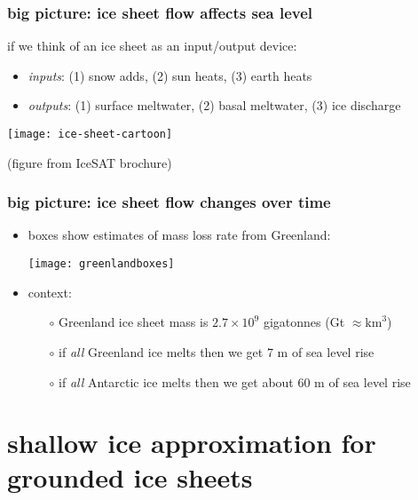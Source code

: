 \documentclass{beamer}
\begin{document}
\begin{frame}
  \frametitle{big picture: ice sheet flow affects sea level}

\small
if we think of an ice sheet as an input/output device:
\begin{itemize}
\item \emph{inputs}: (1) snow adds, (2) sun heats, (3) earth heats
\item \emph{outputs}: (1) surface meltwater, (2) basal meltwater, (3) ice discharge
\end{itemize}

\begin{center}
  \texttt{[image: ice-sheet-cartoon]}

  \tiny (figure from IceSAT brochure)
\end{center}
\end{frame}


\begin{frame}
  \frametitle{big picture: ice sheet flow changes over time}

\small
\begin{itemize}
\item boxes show estimates of mass loss rate from Greenland:
\begin{center}
    \texttt{[image: greenlandboxes]}
\end{center}

\vspace{-0.21in}
\item context:
  \begin{itemize}
  \item[$\circ$]  Greenland ice sheet mass is $2.7 \times 10^9$ gigatonnes (Gt $\approx \text{km}^3$) %
  \item[$\circ$]  if \emph{all} Greenland ice melts then we get 7 m of sea level rise
  \item[$\circ$]  if \emph{all} Antarctic ice melts then we get about 60 m of sea level rise
  \end{itemize}
\end{itemize}
\end{frame}


\section[shallow ice approximation]{shallow ice approximation for grounded ice sheets}
\end{document}
